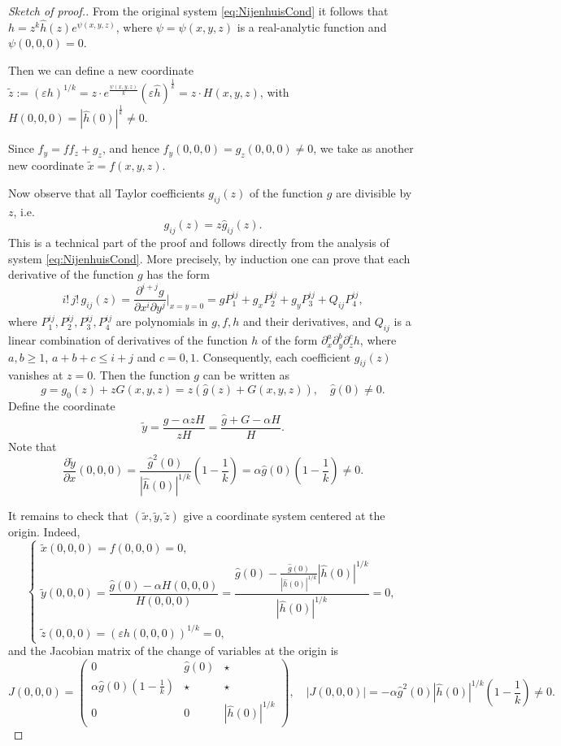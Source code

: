 \documentclass[12pt]{article}
\theoremstyle{plain}
\begin{document}
\begin{proof}[Sketch of proof.]
From the original system \eqref{eq:NijenhuisCond} it follows that $h = z^k \hat{h}(z) e^{\psi(x,y,z)}$, where $\psi = \psi(x,y,z)$ is a real-analytic function and $\psi(0,0,0) = 0$.

Then we can define a new coordinate $\tilde z := (\varepsilon h)^{1/k} = z \cdot e^{\frac{\psi(x,y,z)}{k}}(\varepsilon \hat{h})^{\frac{1}{k}} = z \cdot H(x,y,z)$, with $H(0,0,0) = |\hat{h}(0)|^{\frac{1}{k}} \neq 0$.

Since $f_y = f f_z + g_z$, and hence $f_y(0,0,0) = g_z(0,0,0) \neq 0$, we take as another new coordinate $\tilde x = f(x,y,z)$.

Now observe that all Taylor coefficients \(g_{ij}(z)\) of the function $g$ are divisible by \(z\), i.e.
\[
g_{ij}(z)=z\hat g_{ij}(z).
\]
This is a technical part of the proof and follows directly from the analysis of system \eqref{eq:NijenhuisCond}. More precisely, by induction one can prove that each derivative of the function \(g\) has the form
\[
i!\,j!\,g_{ij}(z)
=
\frac{\partial^{i+j}g}{\partial x^i\partial y^j}\bigg|_{x=y=0}
=
gP_1^{ij}
+
g_xP_2^{ij}
+
g_yP_3^{ij}
+
Q_{ij}P_4^{ij},
\]
where \(P_1^{ij},P_2^{ij},P_3^{ij},P_4^{ij}\) are polynomials in \(g,f,h\) and their derivatives, and \(Q_{ij}\) is a linear combination of derivatives of the function $h$ of the form $\partial_x^a\partial_y^b\partial_z^c h$,
where \(a,b\ge 1\), \(a+b+c\le i+j\) and \(c=0,1\).
Consequently, each coefficient $g_{ij}(z)$ vanishes at \(z=0\).
Then the function $g$ can be written as
$$
g = g_0(z) + z G(x,y,z) = z\left(\hat{g}(z) + G(x,y,z)\right), \quad \hat{g}(0) \neq 0.
$$
Define the coordinate 
$$\tilde{y} = \frac{g - \alpha z H}{z H} = \frac{\hat{g} + G - \alpha H}{H}.$$  
Note that
$$\frac{\partial \tilde{y}}{\partial x}(0,0,0) = \frac{\hat{g}^2(0)}{|\hat{h}(0)|^{1/k}}\left(1 - \frac{1}{k} \right) = \alpha \hat{g}(0)\left(1 - \frac{1}{k} \right) \neq 0.
$$

It remains to check that $(\tilde{x}, \tilde{y}, \tilde{z})$ give a coordinate system centered at the origin. Indeed,
$$
\begin{cases}
    \tilde{x}(0,0,0) = f(0,0,0) = 0, \\
    \tilde{y}(0,0,0) = \dfrac{\hat{g}(0) - \alpha H(0,0,0)}{H(0,0,0)} = \dfrac{\hat{g}(0) - \frac{\hat{g}(0)}{|\hat{h}(0)|^{1/k}} |\hat{h}(0)|^{1/k}}{ |\hat{h}(0)|^{1/k}} = 0, \\
    \tilde{z}(0,0,0) = (\varepsilon h(0,0,0))^{1/k} = 0,
\end{cases}
$$
and the Jacobian matrix of the change of variables at the origin is
$$
J(0,0,0) = \begin{pmatrix}
    0 & \hat{g}(0) & \star \\
   \alpha \hat{g}(0)\left(1 - \frac{1}{k} \right) & \star & \star \\
    0 & 0 & |\hat{h}(0)|^{1/k}
\end{pmatrix}, \quad |J(0,0,0)| = -\alpha \hat{g}^2(0) |\hat{h}(0)|^{1/k} \left(1 - \frac{1}{k} \right) \neq 0.
$$


\end{proof}
\end{document}
